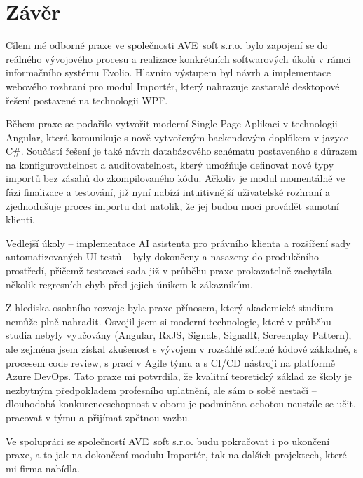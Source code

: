 \chapter{Závěr}
\label{chap:conclusion}

Cílem mé odborné praxe ve společnosti AVE~soft s.r.o. bylo zapojení se do reálného vývojového procesu a realizace konkrétních softwarových úkolů v rámci informačního systému Evolio. Hlavním výstupem byl návrh a implementace webového rozhraní pro modul Importér, který nahrazuje zastaralé desktopové řešení postavené na technologii WPF.

Během praxe se podařilo vytvořit moderní Single Page Aplikaci v technologii Angular, která komunikuje s nově vytvořeným backendovým doplňkem v jazyce C\#. Součástí řešení je také návrh databázového schématu postaveného s důrazem na konfigurovatelnost a auditovatelnost, který umožňuje definovat nové typy importů bez zásahů do zkompilovaného kódu. Ačkoliv je modul momentálně ve fázi finalizace a testování, již nyní nabízí intuitivnější uživatelské rozhraní a zjednodušuje proces importu dat natolik, že jej budou moci provádět samotní klienti.

Vedlejší úkoly -- implementace AI asistenta pro právního klienta a rozšíření sady automatizovaných UI testů -- byly dokončeny a nasazeny do produkčního prostředí, přičemž testovací sada již v průběhu praxe prokazatelně zachytila několik regresních chyb před jejich únikem k zákazníkům.

Z hlediska osobního rozvoje byla praxe přínosem, který akademické studium nemůže plně nahradit. Osvojil jsem si moderní technologie, které v průběhu studia nebyly vyučovány (Angular, RxJS, Signals, SignalR, Screenplay Pattern), ale zejména jsem získal zkušenost s vývojem v rozsáhlé sdílené kódové základně, s procesem code review, s prací v Agile týmu a s CI/CD nástroji na platformě Azure DevOps. Tato praxe mi potvrdila, že kvalitní teoretický základ ze školy je nezbytným předpokladem profesního uplatnění, ale sám o sobě nestačí -- dlouhodobá konkurenceschopnost v oboru je podmíněna ochotou neustále se učit, pracovat v týmu a přijímat zpětnou vazbu.

Ve spolupráci se společností AVE~soft s.r.o. budu pokračovat i po ukončení praxe, a to jak na dokončení modulu Importér, tak na dalších projektech, které mi firma nabídla.
